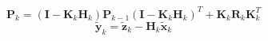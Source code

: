 \begin{equation}
\mathbf{P}_k = \left(\mathbf{I} - \mathbf{K}_k\mathbf{H}_{k}\right) \mathbf{P}_{k-1}\left(\mathbf{I} - \mathbf{K}_k\mathbf{H}_{k}\right)^T + \mathbf{K}_k\mathbf{R}_k\mathbf{K}_k^T 
\end{equation}
\begin{equation}
\tilde{\mathbf{y}}_k = \tilde{\mathbf{z}}_{k} -  \mathbf{H}_k\tilde{\mathbf{x}}_{k}
\end{equation}











